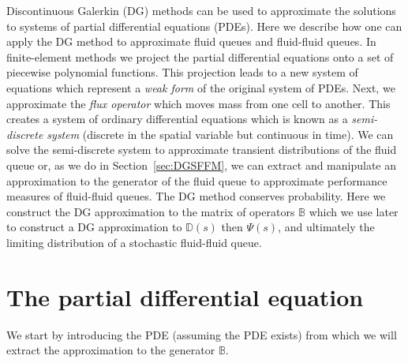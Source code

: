 Discontinuous Galerkin (DG) methods can be used to approximate the solutions to systems of partial differential equations (PDEs). Here we describe how one can apply the DG method to approximate fluid queues and fluid-fluid queues. In finite-element methods we project the partial differential equations onto a set of piecewise polynomial functions. This projection leads to a new system of equations which represent a \textit{weak form} of the original system of PDEs. Next, we approximate the \textit{flux operator} which moves mass from one cell to another. This creates a system of ordinary differential equations which is known as a \emph{semi-discrete system} (discrete in the spatial variable but continuous in time). We can solve the semi-discrete system to approximate transient distributions of the fluid queue or, as we do in Section~\ref{sec:DGSFFM}, we can extract and manipulate an approximation to the generator of the fluid queue to approximate performance measures of fluid-fluid queues. The DG method conserves probability. Here we construct the DG approximation to the matrix of operators \(\mathbb B\) which we use later to construct a DG approximation to \(\mathbb D(s)\) then \(\mathbb\Psi(s)\), and ultimately the limiting distribution of a stochastic fluid-fluid queue. 

\section{The partial differential equation}
We start by introducing the PDE (assuming the PDE exists) from which we will extract the approximation to the generator \(\mathbb B\). 


